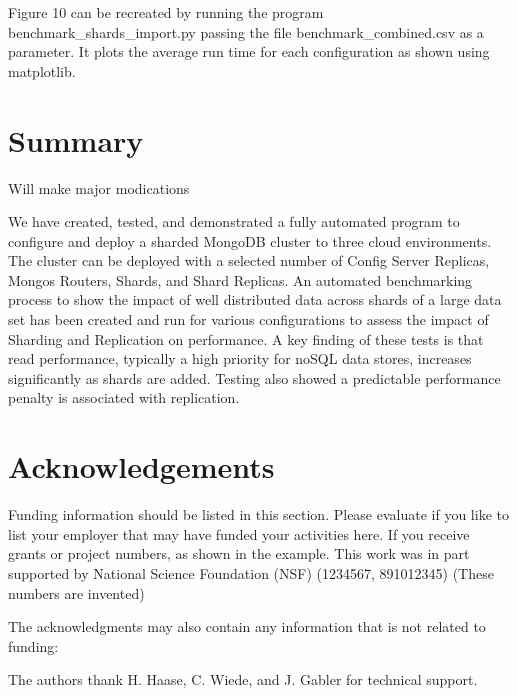 \documentclass[9pt,twocolumn,twoside]{styles/osajnl}
\begin{document}
Figure 10 can be recreated by running the program benchmark\_shards\_import.py passing the file benchmark\_combined.csv as a parameter.  It plots the average run time for each configuration as shown using matplotlib.



\section{Summary}

Will make major modications

We have created, tested, and demonstrated a fully automated program to configure and deploy a sharded MongoDB cluster to three cloud environments.  The cluster can be deployed with a selected number of Config Server Replicas, Mongos Routers, Shards, and Shard Replicas.  An automated benchmarking process to show the impact of well distributed data across shards of a large data set has been created and run for various configurations to assess the impact of Sharding and Replication on performance.  A key finding of these tests is that read performance, typically a high priority for noSQL data stores, increases significantly as shards are added.  Testing also showed a predictable performance penalty is associated with replication.




\section*{Acknowledgements}

Funding information should be listed in this section. Please evaluate
if you like to list your employer that may have funded your activities
here.  If you receive grants or project numbers, as shown in the
example.  This work was in part supported by National Science
Foundation (NSF) (1234567, 891012345) (These numbers are invented)

The acknowledgments may also contain any information that is not
related to funding:

The authors thank H. Haase, C. Wiede, and J. Gabler for technical
support.




 
\end{document}
